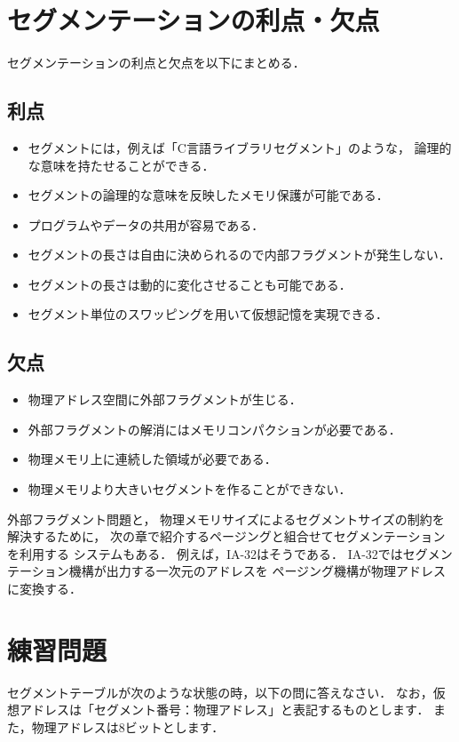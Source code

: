 \section{セグメンテーションの利点・欠点}
セグメンテーションの利点と欠点を以下にまとめる．

\subsection*{利点}
\begin{itemize}
\item セグメントには，例えば「C言語ライブラリセグメント」のような，
論理的な意味を持たせることができる．
\item セグメントの論理的な意味を反映したメモリ保護が可能である．
\item プログラムやデータの共用が容易である．
\item セグメントの長さは自由に決められるので内部フラグメントが発生しない．
\item セグメントの長さは動的に変化させることも可能である．
\item セグメント単位のスワッピングを用いて仮想記憶を実現できる．
\end{itemize}

\subsection*{欠点}
\begin{itemize}
\item 物理アドレス空間に外部フラグメントが生じる．
\item 外部フラグメントの解消にはメモリコンパクションが必要である．
\item 物理メモリ上に連続した領域が必要である．
\item 物理メモリより大きいセグメントを作ることができない．
\end{itemize}

外部フラグメント問題と，
物理メモリサイズによるセグメントサイズの制約を解決するために，
次の章で紹介するページングと組合せてセグメンテーションを利用する
システムもある．
例えば，IA-32はそうである．
IA-32ではセグメンテーション機構が出力する一次元のアドレスを
ページング機構が物理アドレスに変換する．

\section*{練習問題}
セグメントテーブルが次のような状態の時，以下の問に答えなさい．
なお，仮想アドレスは「セグメント番号：物理アドレス」と表記するものとします．
また，物理アドレスは8ビットとします．

